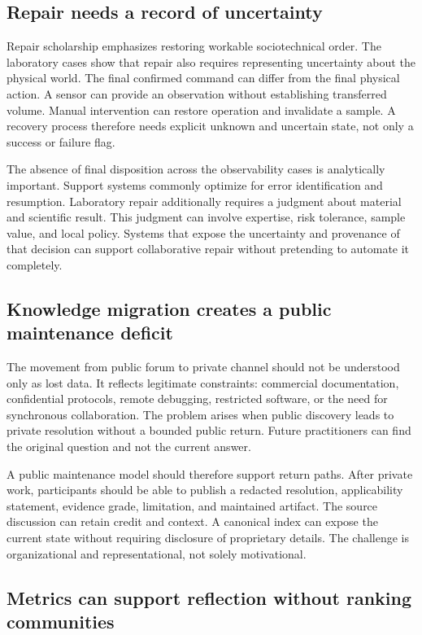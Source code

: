 \subsection{Repair needs a record of uncertainty}

Repair scholarship emphasizes restoring workable sociotechnical order. The laboratory cases show that repair also requires representing uncertainty about the physical world. The final confirmed command can differ from the final physical action. A sensor can provide an observation without establishing transferred volume. Manual intervention can restore operation and invalidate a sample. A recovery process therefore needs explicit unknown and uncertain state, not only a success or failure flag.

The absence of final disposition across the observability cases is analytically important. Support systems commonly optimize for error identification and resumption. Laboratory repair additionally requires a judgment about material and scientific result. This judgment can involve expertise, risk tolerance, sample value, and local policy. Systems that expose the uncertainty and provenance of that decision can support collaborative repair without pretending to automate it completely.

\subsection{Knowledge migration creates a public maintenance deficit}

The movement from public forum to private channel should not be understood only as lost data. It reflects legitimate constraints: commercial documentation, confidential protocols, remote debugging, restricted software, or the need for synchronous collaboration. The problem arises when public discovery leads to private resolution without a bounded public return. Future practitioners can find the original question and not the current answer.

A public maintenance model should therefore support return paths. After private work, participants should be able to publish a redacted resolution, applicability statement, evidence grade, limitation, and maintained artifact. The source discussion can retain credit and context. A canonical index can expose the current state without requiring disclosure of proprietary details. The challenge is organizational and representational, not solely motivational.

\subsection{Metrics can support reflection without ranking communities}

